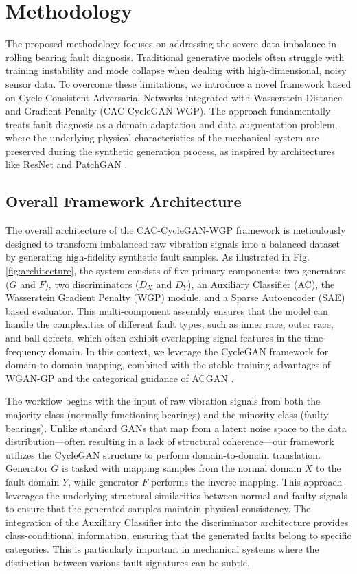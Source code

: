 \section{Methodology}
\label{sec:methodology}

The proposed methodology focuses on addressing the severe data imbalance in rolling bearing fault diagnosis. Traditional generative models often struggle with training instability and mode collapse when dealing with high-dimensional, noisy sensor data. To overcome these limitations, we introduce a novel framework based on Cycle-Consistent Adversarial Networks integrated with Wasserstein Distance and Gradient Penalty (CAC-CycleGAN-WGP). The approach fundamentally treats fault diagnosis as a domain adaptation and data augmentation problem, where the underlying physical characteristics of the mechanical system are preserved during the synthetic generation process, as inspired by architectures like ResNet \cite{He2016} and PatchGAN \cite{Isola2017}.

\subsection{Overall Framework Architecture}
\label{subsec:framework}

The overall architecture of the CAC-CycleGAN-WGP framework is meticulously designed to transform imbalanced raw vibration signals into a balanced dataset by generating high-fidelity synthetic fault samples. As illustrated in Fig. \ref{fig:architecture}, the system consists of five primary components: two generators ($G$ and $F$), two discriminators ($D_X$ and $D_Y$), an Auxiliary Classifier (AC), the Wasserstein Gradient Penalty (WGP) module, and a Sparse Autoencoder (SAE) based evaluator. This multi-component assembly ensures that the model can handle the complexities of different fault types, such as inner race, outer race, and ball defects, which often exhibit overlapping signal features in the time-frequency domain. In this context, we leverage the CycleGAN \cite{4} framework for domain-to-domain mapping, combined with the stable training advantages of WGAN-GP \cite{3} and the categorical guidance of ACGAN \cite{5}.

The workflow begins with the input of raw vibration signals from both the majority class (normally functioning bearings) and the minority class (faulty bearings). Unlike standard GANs that map from a latent noise space to the data distribution—often resulting in a lack of structural coherence—our framework utilizes the CycleGAN structure to perform domain-to-domain translation. Generator $G$ is tasked with mapping samples from the normal domain $X$ to the fault domain $Y$, while generator $F$ performs the inverse mapping. This approach leverages the underlying structural similarities between normal and faulty signals to ensure that the generated samples maintain physical consistency. The integration of the Auxiliary Classifier into the discriminator architecture provides class-conditional information, ensuring that the generated faults belong to specific categories. This is particularly important in mechanical systems where the distinction between various fault signatures can be subtle.

